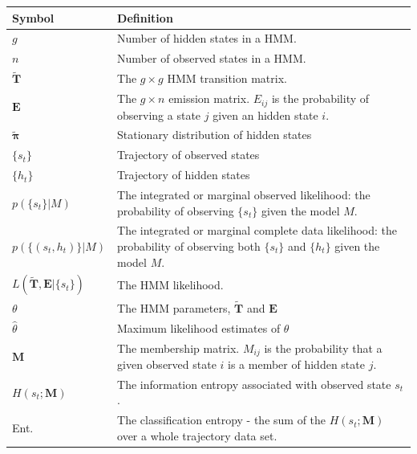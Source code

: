 \begin{table}
    \centering
    \begin{tabularx}{0.9\textwidth}{ |l| >{\raggedright\arraybackslash}X | } 
    \hline
    \textbf{Symbol}  &  \textbf{Definition} \\
    \hline\hline
    $g$ & Number of hidden states in a HMM. \\
    $n$ & Number of observed states in a HMM. \\
    $\mathbf{\tilde{T}}$ & The $g\times g$ HMM transition matrix. \\
    $\mathbf{E}$ & The $g \times n$ emission matrix. $E_{ij}$ is the probability of observing a state $j$ given an hidden state $i$. \\
    $\tilde{\bm{\pi}}$ & Stationary distribution of hidden states \\
    $\{s_{t}\}$ & Trajectory of observed states \\
    $\{h_{t}\}$ & Trajectory of hidden states \\
    $p(\{s_t\}|M)$ & The integrated or marginal observed likelihood: the probability of observing $\{s_t\}$ given the model $M$. \\
    $p(\{(s_t, h_t)\}|M)$ & The integrated or marginal complete data likelihood: the probability of observing both $\{s_t\}$ and $\{h_t\}$ given the model $M$.  \\
    $L(\tilde{\mathbf{T}}, \mathbf{E}| \{s_t\})$ & The HMM likelihood. \\
    $\theta$ & The HMM parameters, $\tilde{\mathbf{T}}$ and $\mathbf{E}$\\
    $\hat{\theta}$ & Maximum likelihood estimates of $\theta$ \\
    $\mathbf{M}$ & The membership matrix. $M_{ij}$ is the probability that a given observed state $i$ is a member of hidden state $j$. \\
    $H(s_{t}; \mathbf{M})$ & The information entropy associated with observed state $s_{t}$. \\
    Ent. & The classification entropy - the sum of the $H(s_{t}; \mathbf{M})$ over a whole trajectory data set. \\
    \hline
    \end{tabularx}
    \label{tab:hmm_symbols}
\end{table}



